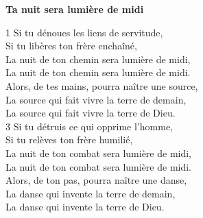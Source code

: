 \textbf{Ta nuit sera lumière de midi}

1 Si tu dénoues les liens de servitude, \\
Si tu libères ton frère enchaîné, \\
La nuit de ton chemin sera lumière de midi, \\
La nuit de ton chemin sera lumière de midi. \\
Alors, de tes mains, pourra naître une source, \\
La source qui fait vivre la terre de demain, \\
La source qui fait vivre la terre de Dieu. \\


3 Si tu détruis ce qui opprime l’homme, \\
Si tu relèves ton frère humilié, \\
La nuit de ton combat sera lumière de midi, \\
La nuit de ton combat sera lumière de midi. \\
Alors, de ton pas, pourra naître une danse, \\
La danse qui invente la terre de demain, \\
La danse qui invente la terre de Dieu. \\


